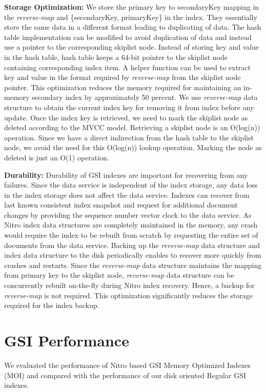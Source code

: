 \documentclass{vldb}
\begin{document}
\textbf{Storage Optimization:} We store the primary key to secondaryKey mapping in the \textit{reverse-map} and \{secondaryKey, primaryKey\} in the index. They essentially store the same data in a different format leading to duplicating of data. The hash table implementation can be modified to avoid duplication of data and instead use a pointer to the  corresponding skiplist node. Instead of storing key and value in the hash table, hash table keeps a 64-bit pointer to the skiplist node containing corresponding index item. A helper function can be used to extract key and value in the format required by \textit{reverse-map} from the skiplist node pointer. This optimization reduces the memory required for maintaining an in-memory secondary index by approximately 50 percent. We use \textit{reverse-map} data structure to obtain the current index key for removing it from index before any update. Once the index key is retrieved, we need to mark the skiplist node as deleted according to the MVCC model. Retrieving a skiplist node is an O(log(n)) operation. Since we have a direct indirection from the hash table to the skiplist node, we avoid the need for this O(log(n)) lookup operation. Marking the node as deleted is just an O(1) operation.

\textbf{Durability:} Durability of GSI indexes are important for recovering from any failures. Since the data service is independent of the index storage, any data loss in the index storage does not affect the data service. Indexes can recover from last known consistent index snapshot and  request for additional document changes by providing the sequence number vector clock to the data service. As Nitro index data structures are completely maintained in the memory, any crash would require the index to be rebuilt from scratch by requesting the entire set of documents from the data service. Backing up the \textit{reverse-map} data structure and index data structure to the disk periodically enables to recover more quickly from crashes and restarts. Since the \textit{reverse-map} data structure maintains the mapping from primary key to the skiplist node, \textit{reverse-map} data structure can be concurrently rebuilt on-the-fly during Nitro index recovery. Hence, a backup for \textit{reverse-map} is not required. This optimization significantly reduces the storage required for the index backup.

\section{GSI Performance}
We evaluated the performance of Nitro based GSI Memory Optimized Indexes (MOI) and compared with the performance of our disk oriented Regular GSI indexes.
\end{document}
